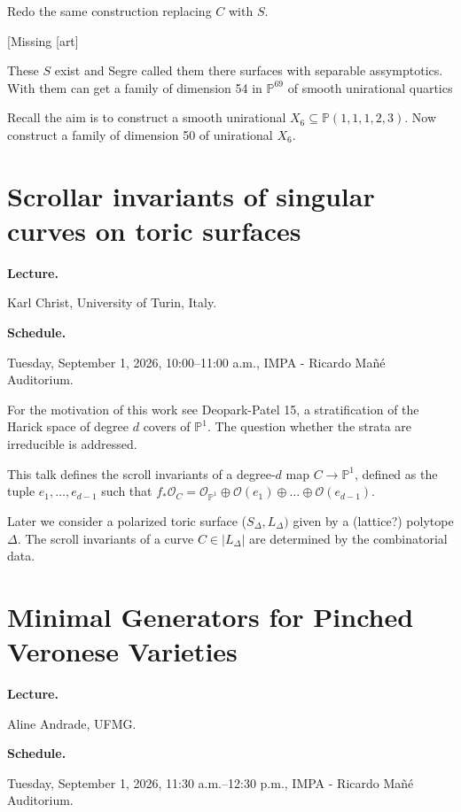 Redo the same construction replacing $C$
with $S$.

[Missing [art]

These $S$ exist and Segre called them there
surfaces with separable assymptotics.
With them can get a family of dimension 54
in $\mathbb{P}^{69}$
of smooth unirational quartics

Recall the aim is to construct a smooth
unirational $X_6 \subseteq
\mathbb{P}(1,1,1,2,3)$.
Now construct a family of dimension 50
of unirational $X_6$.



\section{Scrollar invariants of singular
curves on toric surfaces}
\label{section-scrollar-invariants}

\medskip\noindent
{\bf Lecture.}

Karl Christ,
University of Turin, Italy.

\medskip\noindent
{\bf Schedule.}

Tuesday, September 1, 2026,
10:00--11:00 a.m.,
IMPA - Ricardo Ma\~n\'e Auditorium.

\medskip\noindent
For the motivation of this work see
Deopark-Patel 15, a stratification of the
Harick space of degree $d$ covers
of $\mathbb{P}^1$. The question whether 
the strata are irreducible is addressed.

This talk defines the scroll invariants of a
degree-$d$ map $C \to \mathbb{P}^1$, defined
as the tuple $e_1,…,e_{d-1}$ such that
$f_*\mathcal{O}_C =
\mathcal{O}_{\mathbb{P}^1}\oplus
\mathcal{O}(e_1) \oplus … \oplus
\mathcal{O}(e_{d-1})$.

Later we consider a polarized toric surface
($S_{\Delta},L_\Delta)$ 
given by a (lattice?) polytope $\Delta$.
The scroll invariants of a curve
$C \in |L_\Delta|$ are determined by
the combinatorial data.


\section{Minimal Generators for Pinched
Veronese Varieties}
\label{section-minimal-generators-veronese}

\medskip\noindent
{\bf Lecture.}

Aline Andrade,
UFMG.

\medskip\noindent
{\bf Schedule.}

Tuesday, September 1, 2026,
11:30 a.m.--12:30 p.m.,
IMPA - Ricardo Ma\~n\'e Auditorium.

